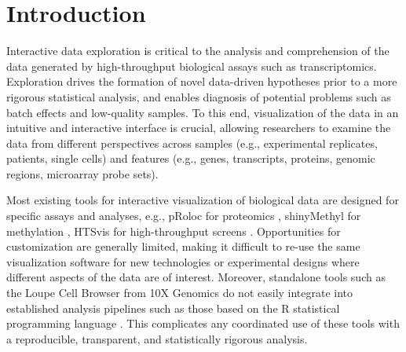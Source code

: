 \documentclass[10pt,a4paper,twocolumn]{article}
\begin{document}
\clearpage

\section*{Introduction}
Interactive data exploration is critical to the analysis and comprehension of the data generated by high-throughput biological assays such as transcriptomics.
Exploration drives the formation of novel data-driven hypotheses prior to a more rigorous statistical analysis, and enables diagnosis of potential problems such as batch effects and low-quality samples.
To this end, visualization of the data in an intuitive and interactive interface is crucial, allowing researchers to examine the data from different perspectives across samples (e.g., experimental replicates, patients, single cells) and features (e.g., genes, transcripts, proteins, genomic regions, microarray probe sets).

Most existing tools for interactive visualization of biological data are designed for specific assays and analyses, e.g., pRoloc for proteomics \citep{gatto2014mass}, shinyMethyl for methylation \citep{fortin2014shinymethyl}, HTSvis for high-throughput screens \citep{scheeder2017htsvis}.
Opportunities for customization are generally limited, making it difficult to re-use the same visualization software for new technologies or experimental designs where different aspects of the data are of interest.
Moreover, standalone tools such as the Loupe Cell Browser from 10X Genomics \citep{zheng2017massively} do not easily integrate into established analysis pipelines such as those based on the R statistical programming language \citep{rcore2008R}.
This complicates any coordinated use of these tools with a reproducible, transparent, and statistically rigorous analysis.
\end{document}
